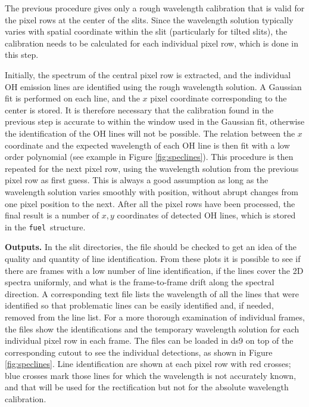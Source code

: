\documentclass[a4paper]{article}
\newcommand{\fuel}{\texttt{fuel}}
\begin{document}
\begin{sloppypar}
The previous procedure gives only a rough wavelength calibration that is valid for the pixel rows at the center of the slits. Since the wavelength solution typically varies with spatial coordinate within the slit (particularly for tilted slits), the calibration needs to be calculated for each individual pixel row, which is done in this step.

Initially, the spectrum of the central pixel row is extracted, and the individual OH emission lines are identified using the rough wavelength solution. A Gaussian fit is performed on each line, and the $x$ pixel coordinate corresponding to the center is stored. It is therefore necessary that the calibration found in the previous step is accurate to within the window used in the Gaussian fit, otherwise the identification of the OH lines will not be possible. The relation between the $x$ coordinate and the expected wavelength of each OH line is then fit with a low order polynomial (see example in Figure \ref{fig:speclines}). This procedure is then repeated for the next pixel row, using the wavelength solution from the previous pixel row as first guess. This is always a good assumption as long as the wavelength solution varies smoothly with position, without abrupt changes from one pixel position to the next. After all the pixel rows have been processed, the final result is a number of $x,y$ coordinates of detected OH lines, which is stored in the \fuel\ structure.

\medskip
\noindent
\textbf{Outputs.} In the slit directories, the file  should be checked to get an idea of the quality and quantity of line identification. From these plots it is possible to see if there are frames with a low number of line identification, if the lines cover the 2D spectra uniformly, and what is the frame-to-frame drift along the spectral direction. A corresponding text file lists the wavelength of all the lines that were identified so that problematic lines can be easily identified and, if needed, removed from the line list. For a more thorough examination of individual frames, the  files show the identifications and the temporary wavelength solution for each individual pixel row in each frame. The  files can be loaded in ds9 on top of the corresponding cutout to see the individual detections, as shown in Figure \ref{fig:speclines}. Line identification are shown at each pixel row with red crosses; blue crosses mark those lines for which the wavelength is not accurately known, and that will be used for the rectification but not for the absolute wavelength calibration.


\end{sloppypar}
\end{document}
